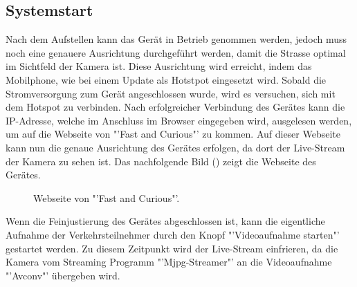 \subsection{Systemstart}
Nach dem Aufstellen kann das Gerät in Betrieb genommen werden, jedoch muss noch eine genauere Ausrichtung durchgeführt werden, damit die Strasse optimal im Sichtfeld der Kamera ist. Diese Ausrichtung wird erreicht, indem das Mobilphone, wie bei einem Update als Hotstpot eingesetzt wird. Sobald die Stromversorgung zum Gerät angeschlossen wurde, wird es versuchen, sich mit dem Hotspot zu verbinden. Nach erfolgreicher Verbindung des Gerätes kann die IP-Adresse, welche im Anschluss im Browser eingegeben wird, ausgelesen werden, um auf die Webseite von "'Fast and Curious"' zu kommen. Auf dieser Webseite kann nun die genaue Ausrichtung des Gerätes erfolgen, da dort der Live-Stream der Kamera zu sehen ist. Das nachfolgende Bild () zeigt die Webseite des Gerätes.

\begin{figure}[H]
  \centering
  \caption{Webseite von "'Fast and Curious"'.}
  \label{bWebsite}
\end{figure} 

Wenn die Feinjustierung des Gerätes abgeschlossen ist, kann die eigentliche Aufnahme der Verkehrsteilnehmer durch den Knopf "'Videoaufnahme starten"' gestartet werden. Zu diesem Zeitpunkt wird der Live-Stream einfrieren, da die Kamera vom Streaming Programm "'Mjpg-Streamer"' an die Videoaufnahme "'Avconv"' übergeben wird.